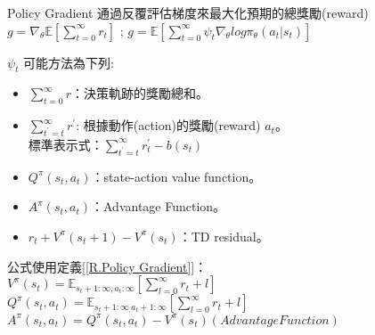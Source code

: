 Policy Gradient 通過反覆評估梯度來最大化預期的總獎勵(reward)\\[5pt]
$g = \nabla_\theta\mathbb{E}[\sum_{t=0}^\infty r_t]$ ; $g = \mathbb{E}[\sum_{t=0}^\infty\psi_t\nabla_\theta log\pi_\theta(a_t \vert s_t)]$\\[5pt]
\begin{Large}{$\psi_t$ 可能方法為下列:}\end{Large}
\begin{itemize}
\item $\sum_{t=0}^\infty r$：決策軌跡的獎勵總和。
\item $\sum_{t^{'}=t}^\infty r^{'}$: 根據動作(action)的獎勵(reward) $a_t$。\\
標準表示式：$\sum_{t^{'}=t}^\infty r_t^{'}-b(s_t)$
\item $Q^\pi(s_t,a_t)$：state-action value function。
\item $A^\pi(s_t,a_t)$：Advantage Function。
\item $r_t+V^\pi(s_t+1)-V^\pi(s_t)$：TD residual。
\end{itemize}
公式使用定義[\ref{R.Policy Gradient}]：\\[5pt]
$V^\pi(s_t) = \mathbb{E}_{s_{t}+1:\infty,a_{t}:\infty}[\sum_{l=0}^\infty r_t+l]$\\[5pt]
$Q^\pi(s_t,a_t) = \mathbb{E}_{s_{t}+1:\infty_,a_{t}+1:\infty}[\sum_{l=0}^\infty r_t+l]$\\[5pt]
$A^\pi(s_t,a_t) = Q^\pi(s_t,a_t)-V^\pi(s_t)(Advantage Function)$\\[5pt]

